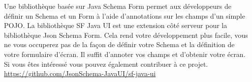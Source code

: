 \documentclass[10pt,a4paper]{altacv}
\begin{document}
\clearpage

Une bibliothèque basée sur Java Schema Form permet aux développeurs de définir un Schema et un Form
à l’aide d’annotations sur les champs d’un simple POJO. La bibliothèque SF Java UI est une extension
côté serveur pour la bibliothèque Json Schema Form. Cela rend votre développement plus facile, vous ne
vous occuperez pas de la façon de définir votre Schema et la définition de votre formulaire d’écran. Il suffit
d’annoter vos champs et d’obtenir votre écran.
Si vous êtes intéressé vous pouvez également contribuer à ce projet.
\url{https://github.com/JsonSchema-JavaUI/sf-java-ui}


\divider



\end{document}

